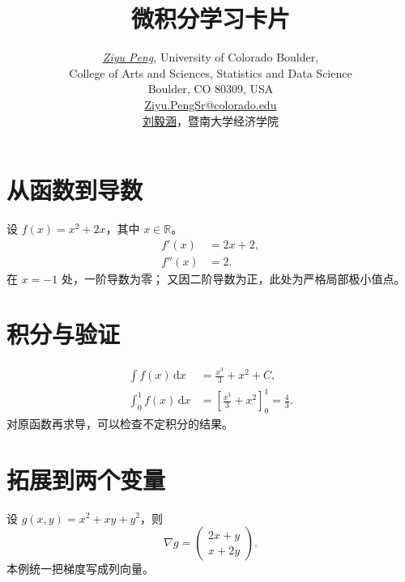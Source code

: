 \documentclass[UTF8,a4paper,fontset=fandol]{ctexart}
\title{微积分学习卡片}
\author{\href{https://github.com/pzy54154631-hub}{\textit{Ziyu Peng}}, University of Colorado Boulder,
  \\[0.1em]College of Arts and Sciences, Statistics and Data Science
  \\[0.1em]Boulder, CO 80309, USA
  \\[0.1em]\href{mailto:Ziyu.PengSr@colorado.edu}{Ziyu.PengSr@colorado.edu}
  \\[0.35em]
  \href{https://pzy54154631-hub.github.io/liuyihan/}{刘毅涵}，暨南大学经济学院}
\date{}
\begin{document}
\maketitle
\section{从函数到导数}
设 \(f(x)=x^2+2x\)，其中 \(x\in\mathbb{R}\)。
\begin{align*}
  f'(x) &= 2x+2,\\
  f''(x) &= 2.
\end{align*}
在 \(x=-1\) 处，一阶导数为零；
又因二阶导数为正，此处为严格局部极小值点。

\section{积分与验证}
\begin{align*}
  \int f(x)\,\mathrm{d}x
    &= \frac{x^3}{3}+x^2+C,\\
  \int_0^1 f(x)\,\mathrm{d}x
    &= \left[\frac{x^3}{3}+x^2\right]_0^1
     = \frac{4}{3}.
\end{align*}
对原函数再求导，可以检查不定积分的结果。

\section{拓展到两个变量}
设 \(g(x,y)=x^2+xy+y^2\)，则
\[
\nabla g=
\begin{pmatrix}
  2x+y\\
  x+2y
\end{pmatrix}.
\]
本例统一把梯度写成列向量。
\end{document}
